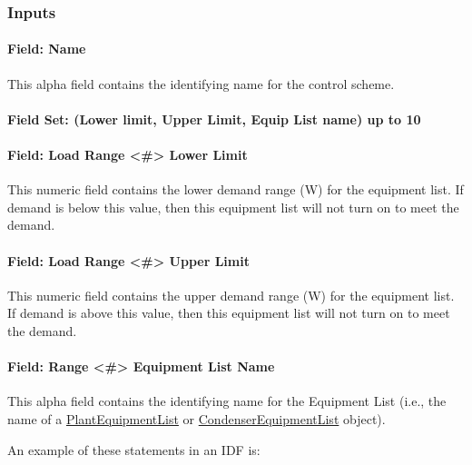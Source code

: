 \subsubsection{Inputs}\label{inputs-4-022}

\paragraph{Field: Name}\label{field-name-3-022}

This alpha field contains the identifying name for the control scheme.

\paragraph{Field Set: (Lower limit, Upper Limit, Equip List name) up to 10}\label{field-set-lower-limit-upper-limit-equip-list-name-up-to-10}

\paragraph{Field: Load Range \textless{}\#\textgreater{} Lower Limit}\label{field-load-range-lower-limit}

This numeric field contains the lower demand range (W) for the equipment list. If demand is below this value, then this equipment list will not turn on to meet the demand.

\paragraph{Field: Load Range \textless{}\#\textgreater{} Upper Limit}\label{field-load-range-upper-limit}

This numeric field contains the upper demand range (W) for the equipment list. If demand is above this value, then this equipment list will not turn on to meet the demand.

\paragraph{Field: Range \textless{}\#\textgreater{} Equipment List Name}\label{field-range-equipment-list-name}

This alpha field contains the identifying name for the Equipment List (i.e., the name of a \hyperref[plantequipmentlist]{PlantEquipmentList} or \hyperref[condenserequipmentlist]{CondenserEquipmentList} object).

An example of these statements in an IDF is:

